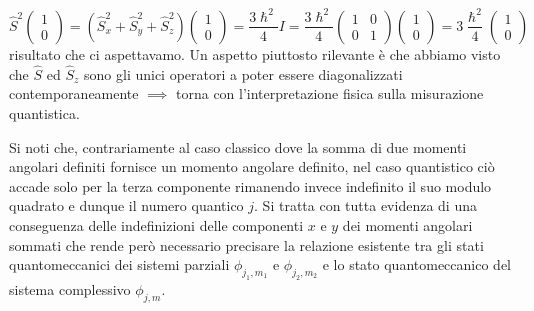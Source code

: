 \[
	\hat{S}^{2}
	\begin{pmatrix}
		1 \\
		0
	\end{pmatrix}
	= (\hat{S}_{x}^{2} + \hat{S}_{y}^{2}+\hat{S}_{z}^{2})\begin{pmatrix}
		1 \\
		0
	\end{pmatrix} = \frac{3 \hslash^{2}}{4} I = \frac{3\hslash^{2}}{4} \begin{pmatrix}
		1 & 0 \\
		0 & 1
	\end{pmatrix}\begin{pmatrix}
		1 \\
		0
	\end{pmatrix}
	= 3 \frac{\hslash^{2}}{4} \begin{pmatrix}
		1 \\
		0
	\end{pmatrix}
\] risultato che ci aspettavamo.
Un aspetto piuttosto rilevante è che
abbiamo visto che \(\hat{S}\) ed \(\hat{S}_{z}\) sono gli unici
operatori a poter essere diagonalizzati contemporaneamente \(\implies\)
torna con l'interpretazione fisica sulla misurazione quantistica.

Si noti che, contrariamente al caso classico dove la somma di due
momenti angolari definiti fornisce un momento angolare definito, nel
caso quantistico ciò accade solo per la terza componente rimanendo
invece indefinito il suo modulo quadrato e dunque il numero quantico
\(j\).
Si tratta con tutta evidenza di una conseguenza delle
indefinizioni delle componenti \(x\) e \(y\) dei momenti angolari
sommati che rende però necessario precisare la relazione esistente tra
gli stati quantomeccanici dei sistemi parziali \(\phi_{j_1, m_1}\) e
\(\phi_{j_2,m_2}\) e lo stato quantomeccanico del sistema complessivo
\(\phi_{j,m}\).

